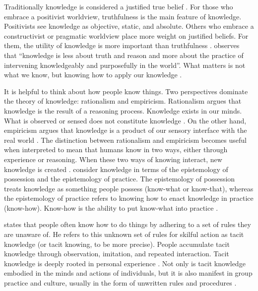 Traditionally knowledge is considered a justified true belief \citep{bolisani2018elusive}. For those who embrace a positivist worldview, truthfulness is the main feature of knowledge. Positivists see knowledge as objective, static, and absolute. Others who embrace a constructivist or pragmatic worldview place more weight on justified beliefs. For them, the utility of knowledge is more important than truthfulness \citep{bolisani2018elusive}. \citet{spender1996organizational} observes that \enquote{knowledge is less about truth and reason and more about the practice of intervening knowledgeably and purposefully in the world}. What matters is not what we know, but knowing how to apply our knowledge \citep{ryle1949concept,orlikowski2002knowing}. \medskip

It is helpful to think about how people know things. Two perspectives dominate the theory of knowledge: rationalism and empiricism. Rationalism argues that knowledge is the result of a reasoning process. Knowledge exists in our minds. What is observed or sensed does not constitute knowledge \citep{russell2009human}. On the other hand, empiricism argues that knowledge is a product of our sensory interface with the real world \citep{bolisani2018elusive}. The distinction between rationalism and empiricism becomes useful when interpreted to mean that humans know in two ways, either through experience or reasoning. When these two ways of knowing interact, new knowledge is created \citep{spender1996making,bolisani2018elusive}. \citet{cook1999bridging} consider knowledge in terms of the epistemology of possession and the epistemology of practice. The epistemology of possession treats knowledge as something people possess (know-what or know-that), whereas the epistemology of practice refers to knowing how to enact knowledge in practice (know-how). Know-how is the ability to put know-what into practice \citep{cook1999bridging,tsoukas2001organizational, marabelli2014knowing}. \medskip

\citet{polanyi1966tacit} states that people often know how to do things by adhering to a set of rules they are unaware of. He refers to this unknown set of rules for skilful action as tacit knowledge (or tacit knowing, to be more precise). People accumulate tacit knowledge through observation, imitation, and repeated interaction. Tacit knowledge is deeply rooted in personal experience \citep{nonaka1995knowledge}. Not only is tacit knowledge embodied in the minds and actions of individuals, but it is also manifest in group practice and culture, usually in the form of unwritten rules and procedures \citep{munoz2015tacit}. \medskip


